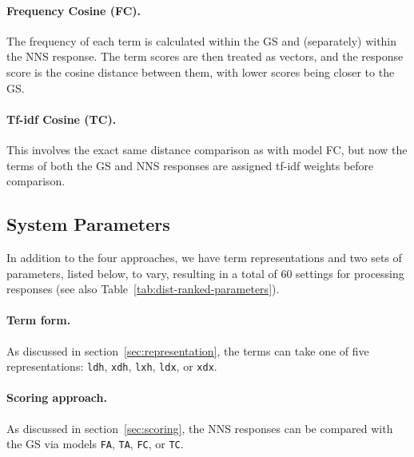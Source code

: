 \documentclass[11pt,letterpaper]{article}
\newcommand{\param}[1]{\texttt{#1}}
\newcommand{\lk}[1]{\marginpar{\scriptsize LK: #1}}
\renewcommand{\marginpar}[1]{}
\begin{document}
\paragraph{Frequency Cosine (FC).} The frequency of each term is
calculated within the GS and (separately) within the NNS response. 
The term scores are then treated as vectors, and the response score is
the cosine distance between them, with lower scores being closer to
the GS.

\paragraph{Tf-idf Cosine (TC).} This involves the exact same
distance comparison as with model FC, but now the terms of both the GS
and NNS responses are assigned tf-idf weights before comparison.

\subsection{System Parameters}
\label{sec:parameters}

In addition to the four approaches, we have term representations and
two sets of parameters, listed below, to vary, resulting in a total of
60 settings for processing responses (see also
Table~\ref{tab:dist-ranked-parameters}). 

\paragraph{Term form.} As discussed in
section~\ref{sec:representation}, the terms can take one of five
representations: \param{ldh}, \param{xdh}, \param{lxh}, \param{ldx},
or \param{xdx}.

\paragraph{Scoring approach.} As discussed in
section~\ref{sec:scoring}, the NNS responses can be
compared with the GS via models \param{FA}, \param{TA}, \param{FC}, or \param{TC}.
\end{document}
